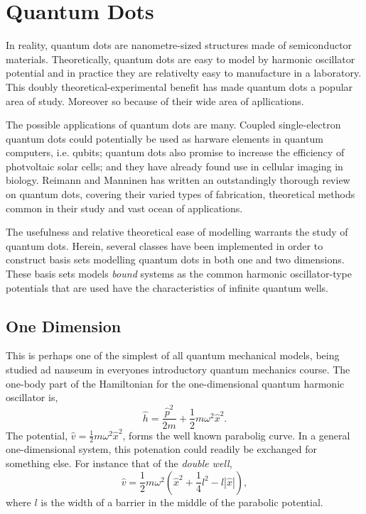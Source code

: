 \section{Quantum Dots}

In reality, quantum dots are nanometre-sized structures made of semiconductor materials.
Theoretically, quantum dots are easy to model by harmonic oscillator potential and in practice
they are relativelty easy to manufacture in a laboratory. This doubly
theoretical-experimental benefit has made quantum dots a popular area of study. Moreover so 
because of their wide area of apllications.

The possible applications of quantum dots are many. Coupled single-electron quantum dots 
could potentially be used as harware elements in quantum computers, i.e.
qubits\cite{loss1998quantum}; quantum dots also promise to increase the efficiency of 
photvoltaic solar cells; and they have already found use in cellular imaging in biology.
Reimann and Manninen\cite{reimann2002electronic} has written an outstandingly
thorough review on quantum dots, covering their varied types of fabrication, theoretical
methods common in their study and vast ocean of applications.

The usefulness and relative theoretical ease of modelling warrants the study of quantum dots.
Herein, several classes have been implemented in order to construct basis sets modelling 
quantum dots in both one and two dimensions. These basis sets models \emph{bound} systems
as the common harmonic oscillator-type potentials that are used have the characteristics of 
infinite quantum wells. 

\subsection{One Dimension}

This is perhaps one of the simplest of all quantum mechanical 
models, being studied ad nauseum in everyones introductory quantum 
mechanics course. The one-body part of the Hamiltonian for the one-dimensional quantum 
harmonic oscillator is,
\begin{equation}
    \label{eq:1d_ho_hamiltonian}
    \hat{h} = \frac{\hat{p}^2}{2m} + \frac{1}{2}m \omega^2\hat{x}^2.
\end{equation}
The potential, $\hat{v} = \frac{1}{2}m \omega^2\hat{x}^2$, forms the well known 
parabolig curve. In a general one-dimensional system, this potenation could 
readily be exchanged for something else. For instance that of the 
\emph{double well},
\begin{equation}
    \hat{v} = \frac{1}{2} m \omega^2
        \left(\hat{x}^2 + \frac{1}{4}l^2 - l |\hat{x}|\right),
\end{equation}
where $l$ is the width of a barrier in the middle of the parabolic 
potential.

